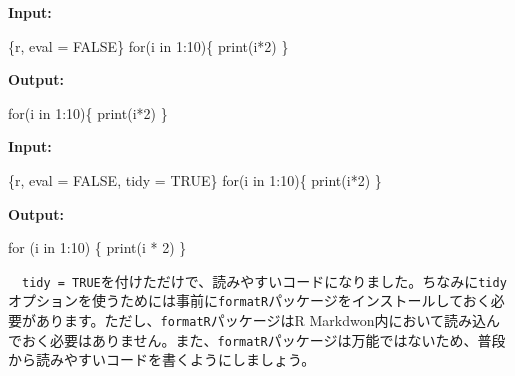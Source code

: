 \documentclass[
  a4paper,
  pandoc,
  ja=standard,
  jafont=haranoaji]{bxjsbook}
\newenvironment{Shaded}{\begin{snugshade}}{\end{snugshade}}
\newcommand{\ControlFlowTok}[1]{\textcolor[rgb]{0.00,0.48,0.65}{#1}}
\newcommand{\DecValTok}[1]{\textcolor[rgb]{0.68,0.00,0.00}{#1}}
\newcommand{\FunctionTok}[1]{\textcolor[rgb]{0.28,0.35,0.67}{#1}}
\newcommand{\InformationTok}[1]{\textcolor[rgb]{0.37,0.37,0.37}{#1}}
\newcommand{\NormalTok}[1]{\textcolor[rgb]{0.00,0.48,0.65}{#1}}
\newcommand{\SpecialCharTok}[1]{\textcolor[rgb]{0.37,0.37,0.37}{#1}}
\begin{document}
\textbf{Input:}

\begin{Shaded}
\begin{Highlighting}[]
\InformationTok{\textasciigrave{}\textasciigrave{}\textasciigrave{}\{r, eval = FALSE\}}
\ControlFlowTok{for}\NormalTok{(i }\ControlFlowTok{in} \DecValTok{1}\SpecialCharTok{:}\DecValTok{10}\NormalTok{)\{}
\FunctionTok{print}\NormalTok{(i}\SpecialCharTok{*}\DecValTok{2}\NormalTok{)}
\NormalTok{\}}
\InformationTok{\textasciigrave{}\textasciigrave{}\textasciigrave{}}
\end{Highlighting}
\end{Shaded}

\textbf{Output:}　

\begin{Shaded}
\begin{Highlighting}[]
\ControlFlowTok{for}\NormalTok{(i }\ControlFlowTok{in} \DecValTok{1}\SpecialCharTok{:}\DecValTok{10}\NormalTok{)\{}
\FunctionTok{print}\NormalTok{(i}\SpecialCharTok{*}\DecValTok{2}\NormalTok{)}
\NormalTok{\}}
\end{Highlighting}
\end{Shaded}

\textbf{Input:}

\begin{Shaded}
\begin{Highlighting}[]
\InformationTok{\textasciigrave{}\textasciigrave{}\textasciigrave{}\{r, eval = FALSE, tidy = TRUE\}}
\ControlFlowTok{for}\NormalTok{(i }\ControlFlowTok{in} \DecValTok{1}\SpecialCharTok{:}\DecValTok{10}\NormalTok{)\{}
\FunctionTok{print}\NormalTok{(i}\SpecialCharTok{*}\DecValTok{2}\NormalTok{)}
\NormalTok{\}}
\InformationTok{\textasciigrave{}\textasciigrave{}\textasciigrave{}}
\end{Highlighting}
\end{Shaded}

\textbf{Output:}

\begin{Shaded}
\begin{Highlighting}[]
\ControlFlowTok{for}\NormalTok{ (i }\ControlFlowTok{in} \DecValTok{1}\SpecialCharTok{:}\DecValTok{10}\NormalTok{) \{}
    \FunctionTok{print}\NormalTok{(i }\SpecialCharTok{*} \DecValTok{2}\NormalTok{)}
\NormalTok{\}}
\end{Highlighting}
\end{Shaded}

　\texttt{tidy\ =\ TRUE}を付けただけで、読みやすいコードになりました。ちなみに\texttt{tidy}オプションを使うためには事前に\texttt{formatR}パッケージをインストールしておく必要があります。ただし、\texttt{formatR}パッケージはR
Markdwon内において読み込んでおく必要はありません。また、\texttt{formatR}パッケージは万能ではないため、普段から読みやすいコードを書くようにしましょう。
\end{document}
